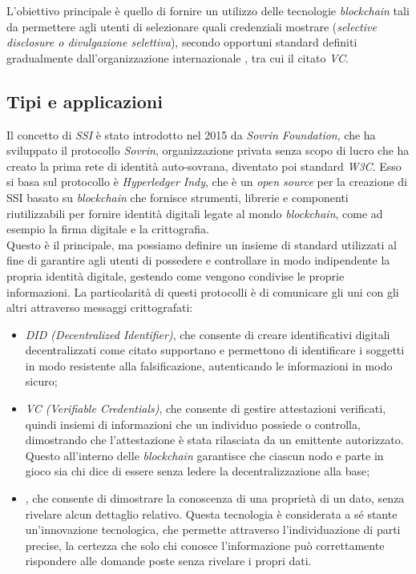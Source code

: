 L'obiettivo principale è quello di fornire un utilizzo delle tecnologie \textit{blockchain} tali da permettere agli utenti 
di selezionare quali credenziali mostrare (\textit{selective disclosure o divulgazione selettiva}),
secondo opportuni standard definiti gradualmente dall'organizzazione internazionale , tra cui il citato \textit{VC}.\@

\subsection{Tipi e applicazioni}\label{sec:self-sovereign-identity-tipi-applicazioni}

Il concetto di \textit{SSI}  è stato introdotto nel 2015 da \textit{Sovrin Foundation}, che ha sviluppato il protocollo \textit{Sovrin},
organizzazione privata senza scopo di lucro che ha creato la prima rete di identità auto-sovrana, diventato poi standard \textit{W3C}. 
Esso si basa sul protocollo è \textit{Hyperledger Indy}, che è un  \textit{open source} per la creazione di SSI basato su \textit{blockchain}
che fornisce strumenti, librerie e componenti riutilizzabili per fornire identità digitali legate al mondo \textit{blockchain}, 
come ad esempio la firma digitale e la crittografia. \\

Questo è il principale, ma possiamo definire un insieme di standard 
utilizzati al fine di garantire agli utenti di possedere e controllare in modo indipendente la propria identità digitale, gestendo come vengono
condivise le proprie informazioni. La particolarità di questi protocolli è di comunicare gli uni con gli altri attraverso messaggi crittografati:
\begin{itemize}
    \item \textit{DID (Decentralized Identifier)}, che consente di creare identificativi digitali decentralizzati come citato supportano
    e permettono di identificare i soggetti in modo resistente alla falsificazione, autenticando le informazioni in modo sicuro;
    \item \textit{VC (Verifiable Credentials)}, che consente di gestire attestazioni verificati, quindi insiemi di informazioni che un individuo
    possiede o controlla, dimostrando che l'attestazione è stata rilasciata da un emittente autorizzato. Questo all'interno delle \textit{blockchain}
    garantisce che ciascun nodo e parte in gioco sia chi dice di essere senza ledere la decentralizzazione alla base;
    \item {}, che consente di dimostrare la conoscenza di una proprietà di un dato, senza rivelare alcun dettaglio relativo.
    Questa tecnologia è considerata a sé stante un'innovazione tecnologica, che permette attraverso l'individuazione di parti precise,
    la certezza che solo chi conosce l'informazione può correttamente rispondere alle domande poste senza rivelare i propri dati.
\end{itemize}

